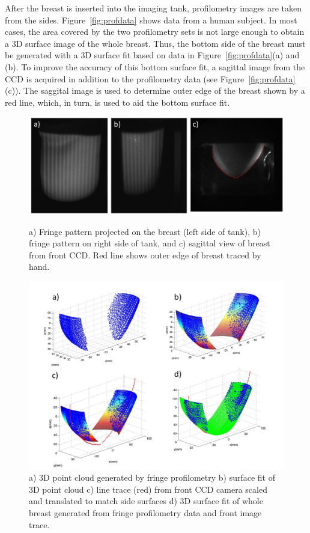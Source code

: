 After the breast is inserted into the imaging tank, profilometry images are taken from the sides. Figure~\ref{fig:profdata} shows data from a human subject. In most cases, the area covered by the two profilometry sets is not large enough to obtain a 3D surface image of the whole breast. Thus, the bottom side of the breast must be generated with a 3D surface fit based on data in Figure~\ref{fig:profdata}(a) and (b). To improve the accuracy of this bottom surface fit, a sagittal image from the CCD is acquired in addition to the profilometry data (see Figure~\ref{fig:profdata}(c)). The saggital image is used to determine outer edge of the breast shown by a red line, which, in turn, is used to aid the bottom surface fit.  
\begin{figure}[!htp]
\centering
\includegraphics[width=14cm]{./figures/4_Gen3/profdata.png}
\caption[Examples of profilometry measurements of the breast]{a) Fringe pattern projected on the breast (left side of tank), b) fringe pattern on right side of tank, and c) sagittal view of breast from front CCD. Red line shows outer edge of breast traced by hand.}
\label{fig:profdata}
\includegraphics[width=14.5cm]{./figures/4_Gen3/proffit.png}
\caption[Profilometry data fits for 3D surface]{ a) 3D point cloud generated by fringe profilometry b)  surface fit of 3D point cloud c) line trace (red) from front CCD camera scaled and translated to match side surfaces d) 3D surface fit of whole breast generated from fringe profilometry data and front image trace.}
\label{fig:proffit}
\end{figure}

